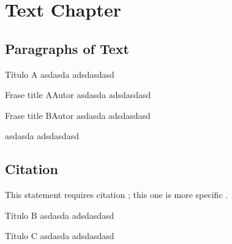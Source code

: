 
\chapter{Text Chapter}

\section{Paragraphs of Text}

\lipsum[1] %

\begin{informationbox}{Título A}
asdasda
\lipsum[1] 
adsdasdasd
\end{informationbox}
\lipsum[1] %


\begin{frasebox}{Frase title A}{Autor}
asdasda
\lipsum[1] 
adsdasdasd
\end{frasebox}

\begin{frasebox}{Frase title B}{Autor}
asdasda
\lipsum[1] 
adsdasdasd
\end{frasebox}

\lipsum[1] %
\begin{citando}
asdasda
\lipsum[1] 
adsdasdasd
\end{citando}


\section{Citation}

This statement requires citation \cite{book_key}; this one is more specific \cite[122]{article_key}.


\lipsum[1-2] %

\begin{informationbox}{Título B}
asdasda
\lipsum[1] 
adsdasdasd
\end{informationbox}


\lipsum[1-2] %
\begin{elaborationbox}{Título C}
asdasda
\lipsum[1] 
adsdasdasd
\end{elaborationbox}


